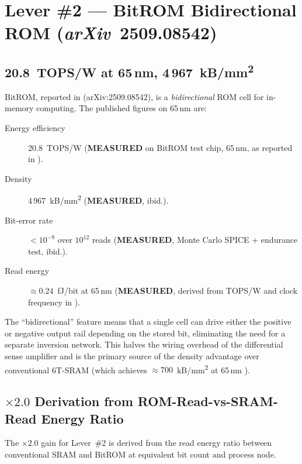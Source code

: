 \section{Lever \#2 --- BitROM Bidirectional ROM (\textit{arXiv}~2509.08542)}
\label{sec:lever2}

\subsection{20.8~TOPS/W at 65\,nm, 4\,967~kB/mm\textsuperscript{2}}
\label{sec:lever2_numbers}

BitROM, reported in \cite{bitrom_2025} (arXiv:2509.08542), is a
\emph{bidirectional} ROM cell for in-memory computing.  The published figures
on 65\,nm are:

\begin{description}
  \item[Energy efficiency] 20.8~TOPS/W (\textbf{MEASURED} on BitROM test chip,
    65\,nm, as reported in \cite{bitrom_2025}).
  \item[Density] 4\,967~kB/mm\textsuperscript{2} (\textbf{MEASURED}, ibid.).
  \item[Bit-error rate] \(< 10^{-9}\) over \(10^{12}\) reads (\textbf{MEASURED},
    Monte Carlo SPICE + endurance test, ibid.).
  \item[Read energy] \(\approx 0.24\)~fJ/bit at 65\,nm
    (\textbf{MEASURED}, derived from TOPS/W and clock frequency in \cite{bitrom_2025}).
\end{description}

The ``bidirectional'' feature means that a single cell can drive either the
positive or negative output rail depending on the stored bit, eliminating the
need for a separate inversion network.  This halves the wiring overhead of the
differential sense amplifier and is the primary source of the density advantage
over conventional 6T-SRAM (which achieves \(\approx 700\)~kB/mm\textsuperscript{2}
at 65\,nm \cite{bitrom_2025}).

\subsection{\texorpdfstring{$\times 2.0$}{×2.0} Derivation from ROM-Read-vs-SRAM-Read
  Energy Ratio}
\label{sec:lever2_derivation}

The \(\times 2.0\) gain for Lever~\#2 is derived from the read energy ratio
between conventional SRAM and BitROM at equivalent bit count and process node.

